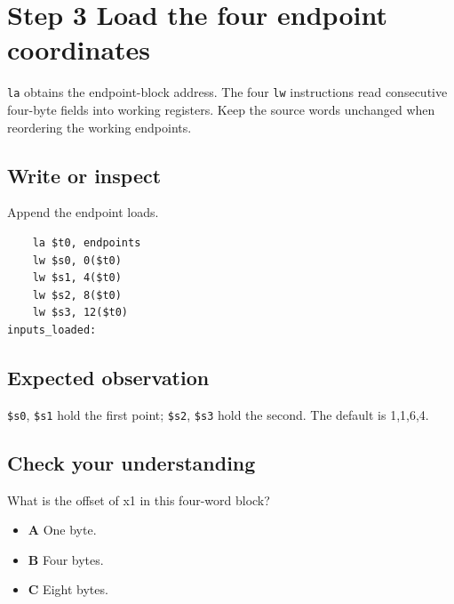 \section{Step 3 Load the four endpoint
  coordinates}\label{007-bresenham-line-s03-step-3-load-the-four-endpoint-coordinates}

\texttt{la} obtains the endpoint-block address. The four \texttt{lw}
instructions read consecutive four-byte fields into working registers.
Keep the source words unchanged when reordering the working endpoints.

\subsection{Write or
  inspect}\label{007-bresenham-line-s03-write-or-inspect}

Append the endpoint loads.

\begin{verbatim}
    la $t0, endpoints
    lw $s0, 0($t0)
    lw $s1, 4($t0)
    lw $s2, 8($t0)
    lw $s3, 12($t0)
inputs_loaded:
\end{verbatim}

\subsection{Expected
  observation}\label{007-bresenham-line-s03-expected-observation}

\texttt{\$s0}, \texttt{\$s1} hold the first point; \texttt{\$s2},
\texttt{\$s3} hold the second. The default is 1,1,6,4.

\subsection{Check your
  understanding}\label{007-bresenham-line-s03-check-your-understanding}

What is the offset of x1 in this four-word block?

\begin{itemize}
  \tightlist
  \item
        \textbf{A} One byte.
  \item
        \textbf{B} Four bytes.
  \item
        \textbf{C} Eight bytes.
\end{itemize}
